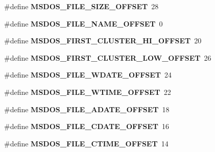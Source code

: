 \begin{DoxyCompactItemize}
\item 
\mbox{\label{group__libfs__msdos_gaded0a5ddf9e53de8cdf08aba7f631a4b}} 
\#define {\bfseries M\+S\+D\+O\+S\+\_\+\+F\+I\+L\+E\+\_\+\+S\+I\+Z\+E\+\_\+\+O\+F\+F\+S\+ET}~28
\item 
\mbox{\label{group__libfs__msdos_gabe35c391d111366a2b8cd8a256b8599b}} 
\#define {\bfseries M\+S\+D\+O\+S\+\_\+\+F\+I\+L\+E\+\_\+\+N\+A\+M\+E\+\_\+\+O\+F\+F\+S\+ET}~0
\item 
\mbox{\label{group__libfs__msdos_ga7ff0b7f7ead8a3405360f06e9fecd139}} 
\#define {\bfseries M\+S\+D\+O\+S\+\_\+\+F\+I\+R\+S\+T\+\_\+\+C\+L\+U\+S\+T\+E\+R\+\_\+\+H\+I\+\_\+\+O\+F\+F\+S\+ET}~20
\item 
\mbox{\label{group__libfs__msdos_gae9e55e8f5b225266703e1cc7335acb75}} 
\#define {\bfseries M\+S\+D\+O\+S\+\_\+\+F\+I\+R\+S\+T\+\_\+\+C\+L\+U\+S\+T\+E\+R\+\_\+\+L\+O\+W\+\_\+\+O\+F\+F\+S\+ET}~26
\item 
\mbox{\label{group__libfs__msdos_ga0f9b8cb3067ca3772c92e42beb7f18a2}} 
\#define {\bfseries M\+S\+D\+O\+S\+\_\+\+F\+I\+L\+E\+\_\+\+W\+D\+A\+T\+E\+\_\+\+O\+F\+F\+S\+ET}~24
\item 
\mbox{\label{group__libfs__msdos_gad28600705bd30ac9fcc45302d3071283}} 
\#define {\bfseries M\+S\+D\+O\+S\+\_\+\+F\+I\+L\+E\+\_\+\+W\+T\+I\+M\+E\+\_\+\+O\+F\+F\+S\+ET}~22
\item 
\mbox{\label{group__libfs__msdos_ga570051d6e10260f49dbe0f8c6e1ae9c8}} 
\#define {\bfseries M\+S\+D\+O\+S\+\_\+\+F\+I\+L\+E\+\_\+\+A\+D\+A\+T\+E\+\_\+\+O\+F\+F\+S\+ET}~18
\item 
\mbox{\label{group__libfs__msdos_gaad55c4a3b263443efab9778fe144cdb4}} 
\#define {\bfseries M\+S\+D\+O\+S\+\_\+\+F\+I\+L\+E\+\_\+\+C\+D\+A\+T\+E\+\_\+\+O\+F\+F\+S\+ET}~16
\item 
\mbox{\label{group__libfs__msdos_gabdbb7496eb891d654d72c5152abfb8ab}} 
\#define {\bfseries M\+S\+D\+O\+S\+\_\+\+F\+I\+L\+E\+\_\+\+C\+T\+I\+M\+E\+\_\+\+O\+F\+F\+S\+ET}~14

\end{DoxyCompactItemize}

